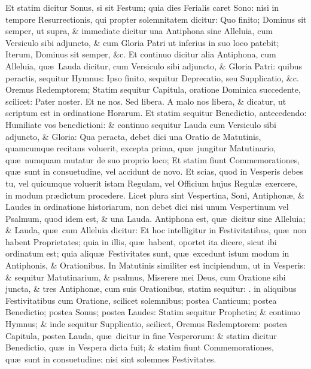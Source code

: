 \documentclass[letter,11pt]{book}
\makeatletter
\DeclareRobustCommand{\Rbar}{\vers@resp{0pt}{R}}
\newcommand{\vers@resp@sym}{\raisebox{0.2ex}{\rotatebox[origin=c]{-20}{$\m@th\rceil$}}}
\newcommand{\vers@resp}[2]{%
  {\ooalign{\hidewidth\kern#1\vers@resp@sym\hidewidth\cr#2\cr}}%
}%
\def\R{\color{Red} \Rbar . \color{black}}
\makeatother
\begin{document}
\begin{multicols}{2}
Et statim dicitur Sonus, si sit Festum; quia dies Ferialis caret Sono: nisi in tempore Resurrectionis, qui propter solemnitatem dicitur: Quo finito; \color{black} Dominus sit semper, \color{Red} ut supra, \& immediate dicitur una Antiphona sine Alleluia, cum Versiculo sibi adjuncto, \& cum \color{black} Gloria Patri \color{Red} ut inferius in suo loco patebit; Iterum, \color{black} Dominus sit semper, \color{Red} \&c.
Et continuo dicitur alia Antiphona, cum Alleluia, qu\ae \ Lauda dicitur, cum Versiculo sibi adjuncto, \& \color{black} Gloria Patri: \color{Red} quibus peractis, sequitur Hymnus: Ipso finito, sequitur Deprecatio, seu Supplicatio, \&c. \color{black} Oremus Redemptorem; \color{Red} Statim sequitur Capitula, oratione Dominica succedente, scilicet: \color{black} Pater noster. Et ne nos. Sed libera. A malo nos libera, \color{Red} \& dicatur, ut scriptum est in ordinatione Horarum.
Et statim sequitur Benedictio, antecedendo: \color{black} Humiliate vos benedictioni: \color{Red} \& continuo sequitur Lauda cum Versiculo sibi adjuncto, \color{black} \& Gloria: \color{Red} Qua peracta, debet dici una Oratio de Matutinis, quamcumque recitans voluerit, excepta prima, qu\ae \ jungitur Matutinario, qu\ae \ numquam mutatur de suo proprio loco; Et statim fiunt Commemorationes, qu\ae \ sunt in consuetudine, vel accidunt de novo.
Et scias, quod in Vesperis debes tu, vel quicumque voluerit istam Regulam, vel Officium hujus Regul\ae \ exercere, in modum pr\ae dictum procedere.
Licet plura sint Vespertina, Soni, Antiphon\ae , \& Laudes in ordinatione historiarum, non debet dici nisi unum Vespertinum vel Psalmum, quod idem est, \& una Lauda.
Antiphona est, qu\ae \ dicitur sine Alleluia; \& Lauda, qu\ae \ cum Alleluia dicitur: Et hoc intelligitur in Festivitatibus, qu\ae \ non habent Proprietates; quia in illis, qu\ae \ habent, oportet ita dicere, sicut ibi ordinatum est; quia aliqu\ae \ Festivitates sunt, qu\ae \ excedunt istum modum in Antiphonis, \& Orationibus.
In Matutinis similiter est incipiendum, ut in Vesperis: \& sequitur Matutinarium, \& psalmus, \color{black} Miserere mei Deus, \color{Red} cum Oratione sibi juncta, \& tres Antiphon\ae , cum suis Orationibus, statim sequitur: \R \color{Red} in aliquibus Festivitatibus cum Oratione,
scilicet solemnibus; postea Canticum; postea Benedictio; postea Sonus; postea Laudes: Statim sequitur Prophetia; \& continuo Hymnus; \& inde sequitur Supplicatio, scilicet, \color{black} Oremus Redemptorem: \color{Red} postea Capitula, postea Lauda, qu\ae \ dicitur in fine Vesperorum: \& statim dicitur Benedictio, qu\ae \ in Vespera dicta fuit; \& statim fiunt Commemorationes, qu\ae \ sunt in consuetudine: nisi sint solemnes Festivitates.

\end{multicols}
\end{document}
